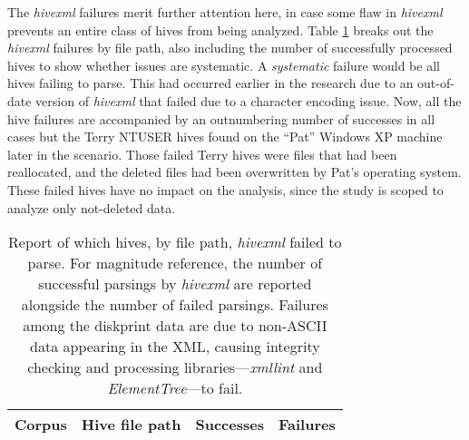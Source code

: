 \documentclass[11pt]{ucthesis}
\theoremstyle{plain}
\theoremstyle{definition}
\newcommand{\hivexml}{\emph{hivexml}\xspace}
\newcommand{\xmllint}{\emph{xmllint}\xspace}
\begin{document}
% 
The \hivexml failures merit further attention here, in case some flaw in \hivexml prevents an entire class of hives from being analyzed.  Table \ref{tbl:rxstats:hivex} breaks out the \hivexml failures by file path, also including the number of successfully processed hives to show whether issues are systematic.  A \emph{systematic} failure would be all hives failing to parse.  This had occurred earlier in the research due to an out-of-date version of \hivexml that failed due to a character encoding issue.  Now, all the hive failures are accompanied by an outnumbering number of successes in all cases but the Terry NTUSER hives found on the ``Pat'' Windows XP machine later in the scenario.  Those failed Terry hives were files that had been reallocated, and the deleted files had been overwritten by Pat's operating system.  These failed hives have no impact on the analysis, since the study is scoped to analyze only not-deleted data.

\begin{table}[htp]
\caption{\label{tbl:rxstats:hivex}Report of which hives, by file path, \hivexml failed to parse.  For magnitude reference, the number of successful parsings by \hivexml are reported alongside the number of failed parsings.  Failures among the diskprint data are due to non-ASCII data appearing in the XML, causing integrity checking and processing libraries---\xmllint and \emph{ElementTree}---to fail.}
\begin{center}
\begin{small}
\begin{tabular}{llrr}
\toprule
Corpus & Hive file path & Successes & Failures \\
\midrule

\bottomrule
\end{tabular}
\end{small}
\end{center}
\end{table}

\end{document}
